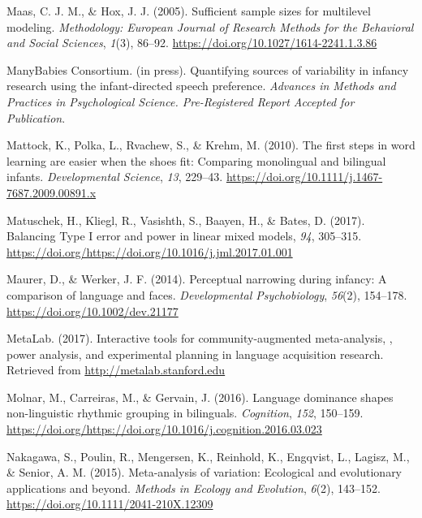 \documentclass[english,,man,floatsintext]{apa6}
\begin{document}
\leavevmode\hypertarget{ref-maas_2005}{}%
Maas, C. J. M., \& Hox, J. J. (2005). Sufficient sample sizes for multilevel modeling. \emph{Methodology: European Journal of Research Methods for the Behavioral and Social Sciences}, \emph{1}(3), 86--92. \url{https://doi.org/10.1027/1614-2241.1.3.86}

\leavevmode\hypertarget{ref-manybabies_consortium_2020}{}%
ManyBabies Consortium. (in press). Quantifying sources of variability in infancy research using the infant-directed speech preference. \emph{Advances in Methods and Practices in Psychological Science. Pre-Registered Report Accepted for Publication}.

\leavevmode\hypertarget{ref-mattock_2010}{}%
Mattock, K., Polka, L., Rvachew, S., \& Krehm, M. (2010). The first steps in word learning are easier when the shoes fit: Comparing monolingual and bilingual infants. \emph{Developmental Science}, \emph{13}, 229--43. \url{https://doi.org/10.1111/j.1467-7687.2009.00891.x}

\leavevmode\hypertarget{ref-matuschek_2017}{}%
Matuschek, H., Kliegl, R., Vasishth, S., Baayen, H., \& Bates, D. (2017). Balancing Type I error and power in linear mixed models, \emph{94}, 305--315. \url{https://doi.org/https://doi.org/10.1016/j.jml.2017.01.001}

\leavevmode\hypertarget{ref-maurer_2014}{}%
Maurer, D., \& Werker, J. F. (2014). Perceptual narrowing during infancy: A comparison of language and faces. \emph{Developmental Psychobiology}, \emph{56}(2), 154--178. \url{https://doi.org/10.1002/dev.21177}

\leavevmode\hypertarget{ref-metalab_2017}{}%
MetaLab. (2017). Interactive tools for community-augmented meta-analysis, , power analysis, and experimental planning in language acquisition research. Retrieved from \url{http://metalab.stanford.edu}

\leavevmode\hypertarget{ref-molnar_2016}{}%
Molnar, M., Carreiras, M., \& Gervain, J. (2016). Language dominance shapes non-linguistic rhythmic grouping in bilinguals. \emph{Cognition}, \emph{152}, 150--159. \url{https://doi.org/https://doi.org/10.1016/j.cognition.2016.03.023}

\leavevmode\hypertarget{ref-nakagawa_2015}{}%
Nakagawa, S., Poulin, R., Mengersen, K., Reinhold, K., Engqvist, L., Lagisz, M., \& Senior, A. M. (2015). Meta-analysis of variation: Ecological and evolutionary applications and beyond. \emph{Methods in Ecology and Evolution}, \emph{6}(2), 143--152. \url{https://doi.org/10.1111/2041-210X.12309}
\end{document}
